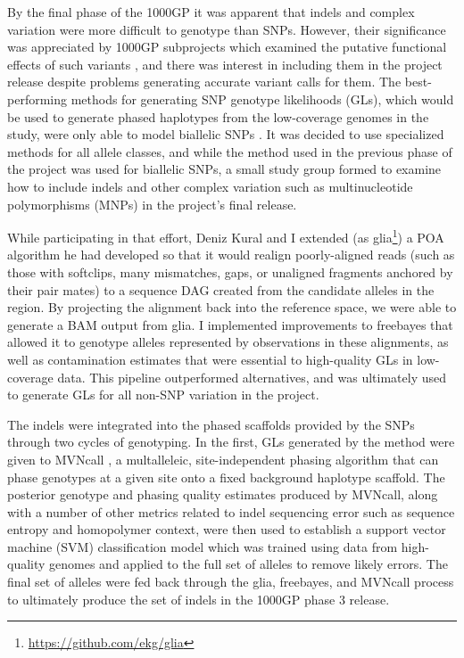 By the final phase of the 1000GP \cite{1000g2015} it was apparent that indels and complex variation were more difficult to genotype than SNPs.
However, their significance was appreciated by 1000GP subprojects which examined the putative functional effects of such variants \cite{challis2015distribution}, and there was interest in including them in the project release despite problems generating accurate variant calls for them.
The best-performing methods for generating SNP genotype likelihoods (GLs), which would be used to generate phased haplotypes from the low-coverage genomes in the study, were only able to model biallelic SNPs \cite{snptools}.
It was decided to use specialized methods for all allele classes, and while the method used in the previous phase of the project was used for biallelic SNPs, a small study group formed to examine how to include indels and other complex variation such as multinucleotide polymorphisms (MNPs) in the project's final release.

While participating in that effort, Deniz Kural and I extended (as glia\footnote{\url{https://github.com/ekg/glia}}) a POA algorithm he had developed so that it would realign poorly-aligned reads (such as those with softclips, many mismatches, gaps, or unaligned fragments anchored by their pair mates) to a sequence DAG created from the candidate alleles in the region.
By projecting the alignment back into the reference space, we were able to generate a BAM output from glia.
I implemented improvements to freebayes that allowed it to genotype alleles represented by observations in these alignments, as well as contamination estimates that were essential to high-quality GLs in low-coverage data.
This pipeline outperformed alternatives, and was ultimately used to generate GLs for all non-SNP variation in the project.

The indels were integrated into the phased scaffolds provided by the SNPs through two cycles of genotyping.
In the first, GLs generated by the method were given to MVNcall \cite{menelaou2012genotype}, a multalleleic, site-independent phasing algorithm that can phase genotypes at a given site onto a fixed background haplotype scaffold.
The posterior genotype and phasing quality estimates produced by MVNcall, along with a number of other metrics related to indel sequencing error such as sequence entropy and homopolymer context, were then used to establish a support vector machine (SVM) classification model which was trained using data from high-quality genomes and applied to the full set of alleles to remove likely errors.
The final set of alleles were fed back through the glia, freebayes, and MVNcall process to ultimately produce the set of indels in the 1000GP phase 3 release.

